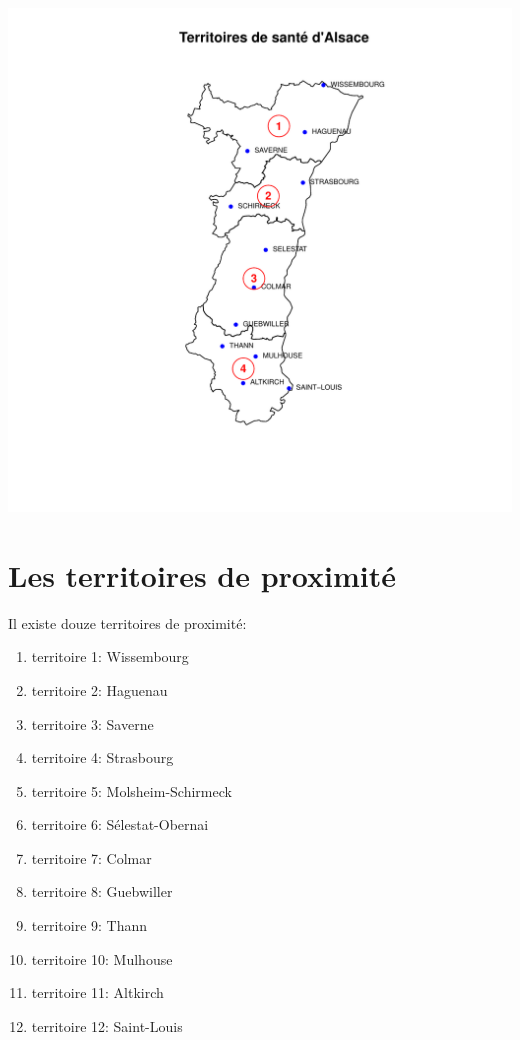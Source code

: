 \documentclass[12pt,english,french,twoside]{book}\usepackage[]{graphicx}\usepackage[]{color}
\makeatletter
\def\maxwidth{ %
  \ifdim\Gin@nat@width>\linewidth
    \linewidth
  \else
    \Gin@nat@width
  \fi
}
\newenvironment{knitrout}{}{} %
\makeatother
\begin{document}
\begin{knitrout}
\color{fgcolor}
\includegraphics[width=\maxwidth]{figure/carte_secteurs_sanitaires-1} 

\end{knitrout}


\section{Les territoires de proximité}


Il existe douze territoires de proximité:
\begin{enumerate}
  \item territoire 1: Wissembourg
  \item territoire 2: Haguenau
  \item territoire 3: Saverne
  \item territoire 4: Strasbourg
  \item territoire 5: Molsheim-Schirmeck
  \item territoire 6: Sélestat-Obernai
  \item territoire 7: Colmar
  \item territoire 8: Guebwiller
  \item territoire 9: Thann
  \item territoire 10: Mulhouse
  \item territoire 11: Altkirch
  \item territoire 12: Saint-Louis
\end{enumerate}
\end{document}
